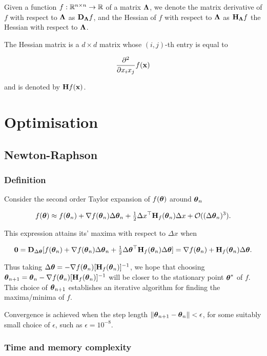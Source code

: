 \documentclass{amsart}[12pt]
\begin{document}
Given a function $f:{\mathbb{R}}^{n \times n} \to {\mathbb{R}}$ of a matrix ${\boldsymbol \Lambda}$, we denote the matrix derivative of $f$ with 
respect to ${\boldsymbol \Lambda}$ as ${\bf D}_{\boldsymbol \Lambda} f$, and the Hessian of $f$ with respect to ${\boldsymbol \Lambda}$ as
${\bf H}_{\boldsymbol \Lambda} f$ the Hessian with respect to ${\boldsymbol \Lambda}$.

The Hessian matrix is a $d \times d$ matrix whose $(i, j)$-th entry is equal to

\[
	\frac{\partial^2}{\partial x_i x_j} f({\bf x})
\]

and is denoted by ${\bf H} f({\bf x})$.

\section{Optimisation}
\subsection{Newton-Raphson}
\cite{Nocedal2006}

\subsubsection{Definition}

Consider the second order Taylor expansion of $f({\boldsymbol \theta})$ around ${\boldsymbol \theta}_{n}$

$$
f({\boldsymbol \theta}) \approx f({\boldsymbol \theta}_{n}) + \nabla f({\boldsymbol \theta}_{n}) \Delta {\boldsymbol\theta}_{n} + \tfrac{1}{2} \Delta x^\top {\bf H}_f({\boldsymbol \theta}_{n}) \Delta x + {\mathcal O}((\Delta {\boldsymbol\theta}_{n})^3).
$$

This expression attains its' maxima with respect to $\Delta x$ when

$$
{\bf 0} = {\bf D}_{\Delta {\boldsymbol\theta}} [f({\boldsymbol \theta}_{n}) + \nabla f({\boldsymbol \theta}_{n}) \Delta {\boldsymbol\theta}_{n} + \tfrac{1}{2} \Delta {\boldsymbol\theta}^\top {\bf H}_f({\boldsymbol \theta}_{n}) \Delta {\boldsymbol\theta}] = \nabla f({\boldsymbol \theta}_n) + {\bf H}_f({\boldsymbol \theta}_n) \Delta {\boldsymbol\theta}.
$$

Thus taking $\Delta {\boldsymbol\theta} = -\nabla f({\boldsymbol \theta}_n) [{\bf H}_f({\boldsymbol \theta}_n)]^{-1}$, we hope that choosing
${\boldsymbol \theta}_{n + 1} = {\boldsymbol \theta}_{n} - \nabla f({\boldsymbol \theta}_n) [{\bf H}_f({\boldsymbol \theta}_n)]^{-1}$ will be closer to the stationary 
point ${\boldsymbol \theta}^*$ of $f$. This choice of ${\boldsymbol \theta}_{n+1}$ establishes an iterative algorithm for finding the 
maxima/minima of $f$.

Convergence is achieved when the step length $\| {\boldsymbol \theta}_{n+1} - {\boldsymbol \theta}_{n} \| < \epsilon$, for some
suitably small choice of $\epsilon$, such as $\epsilon = 10^{-8}$.

\subsubsection{Time and memory complexity}
\end{document}
